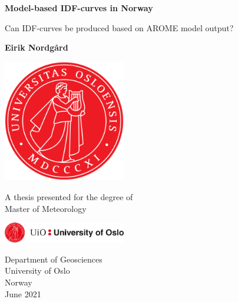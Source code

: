 \begin{titlepage}
    \begin{center}
        \vspace*{1cm}
            
        \Huge
        \textbf{Model-based IDF-curves in Norway}
            
        \vspace{0.5cm}
        \LARGE
        Can IDF-curves be produced based on AROME model output?
            
        \vspace{1.5cm}
            
        \textbf{Eirik Nordgård}
            
        \vfill
        \includegraphics[width=0.4\textwidth]{figures/uio_logo.png}
            
        A thesis presented for the degree of\\
        Master of Meteorology
            
        \vspace{0.8cm}
            
        \includegraphics[width=0.4\textwidth]{figures/uio.png}
            
        \Large
        Department of Geosciences\\
        University of Oslo\\
        Norway\\
        June 2021
            
    \end{center}
\end{titlepage}